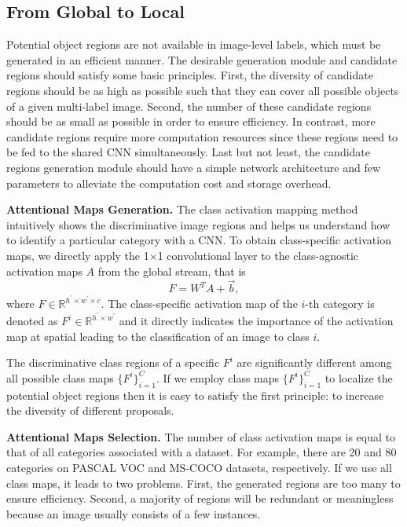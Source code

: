 \documentclass[journal]{IEEEtran}
\begin{document}
\subsection{From Global to Local}
Potential object regions are not available in image-level labels, which must be generated in an efficient manner. The desirable generation module and candidate regions should satisfy some basic principles. First, the diversity of candidate regions should be as high as possible such that they can cover all possible objects of a given multi-label image. Second, the number of these candidate regions should be as small as possible in order to ensure efficiency. In contrast, more candidate regions require more computation resources since these regions need to be fed to the shared CNN simultaneously. Last but not least, the candidate regions generation module should have a simple network architecture and few parameters to alleviate the computation cost and storage overhead.

\noindent \textbf{Attentional Maps Generation.} 
The class activation mapping method~\cite{zhou2016learning} intuitively shows the discriminative image regions and helps us understand how to identify a particular category with a CNN.  To obtain class-specific activation maps, we directly apply the 1$\times$1 convolutional layer to the class-agnostic activation maps $A$ from the global stream, that is
 \begin{equation}\label{eq:cam}
 F = W^T A +  \vec b,
 \end{equation}
 where $F \in \mathbb{R}^{h^\prime \times w^\prime \times c}$. The class-specific activation map of the $i$-th category is denoted as $F^{i}\in  \mathbb{R}^{h^\prime \times w^\prime}$ and it directly indicates the importance of the activation map at spatial leading to the classification of an image to class $i$. 
  
The discriminative class regions of a specific $F^{i}$ are significantly different among all possible class maps $\{F^i\}_{i=1}^C$. If we employ class maps  $\{F^i\}_{i=1}^C$ to localize the potential object regions then it is easy to satisfy the first principle: to increase the diversity of different proposals.
 
\noindent \textbf{Attentional Maps Selection.} 
The number of class activation maps is equal to that of all categories associated with a dataset. For example, there are 20 and 80 categories on PASCAL VOC and MS-COCO datasets, respectively. If we use all class maps, it leads to two problems. First, the generated regions are too many to ensure efficiency. Second, a majority of regions will be redundant or meaningless because an image usually consists of a few instances.
\end{document}
